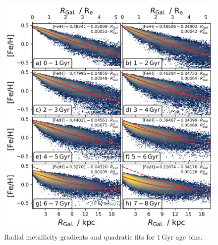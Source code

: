 \documentclass[fleqn,usenatbib]{mnras}
\begin{document}
\begin{figure}
    \centering
    \includegraphics[width=\columnwidth]{figures/quadratic_fit_across_ages.png}
    \caption{Radial metallicity gradients and quadratic fits for $1\,\mathrm{Gyr}$ age bins.}
    \label{fig:quadratic_fit_across_ages}
\end{figure}

\bsp	%
\label{lastpage}
\end{document}
